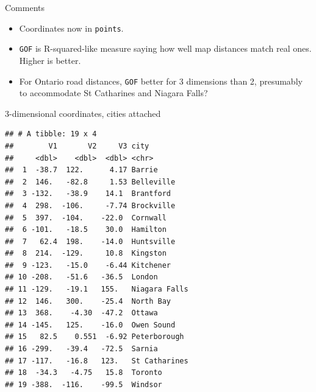 \documentclass[ignorenonframetext,]{beamer}
\newenvironment{Shaded}{\begin{snugshade}}{\end{snugshade}}
\newcommand{\DataTypeTok}[1]{\textcolor[rgb]{0.13,0.29,0.53}{#1}}
\newcommand{\FloatTok}[1]{\textcolor[rgb]{0.00,0.00,0.81}{#1}}
\newcommand{\KeywordTok}[1]{\textcolor[rgb]{0.13,0.29,0.53}{\textbf{#1}}}
\newcommand{\NormalTok}[1]{#1}
\newcommand{\OperatorTok}[1]{\textcolor[rgb]{0.81,0.36,0.00}{\textbf{#1}}}
\newcommand{\StringTok}[1]{\textcolor[rgb]{0.31,0.60,0.02}{#1}}
\begin{document}
\begin{frame}[fragile]{Comments}
\protect\hypertarget{comments-29}{}

\begin{itemize}
\item
  Coordinates now in \texttt{points}.
\item
  \texttt{GOF} is R-squared-like measure saying how well map distances
  match real ones. Higher is better.
\item
  For Ontario road distances, \texttt{GOF} better for 3 dimensions than
  2, presumably to accommodate St Catharines and Niagara Falls?
\end{itemize}

\end{frame}

\begin{frame}[fragile]{3-dimensional coordinates, cities attached}
\protect\hypertarget{dimensional-coordinates-cities-attached}{}

\tiny

\begin{Shaded}
\end{Shaded}

\begin{verbatim}
## # A tibble: 19 x 4
##        V1       V2     V3 city         
##     <dbl>    <dbl>  <dbl> <chr>        
##  1  -38.7  122.      4.17 Barrie       
##  2  146.   -82.8     1.53 Belleville   
##  3 -132.   -38.9    14.1  Brantford    
##  4  298.  -106.     -7.74 Brockville   
##  5  397.  -104.    -22.0  Cornwall     
##  6 -101.   -18.5    30.0  Hamilton     
##  7   62.4  198.    -14.0  Huntsville   
##  8  214.  -129.     10.8  Kingston     
##  9 -123.   -15.0    -6.44 Kitchener    
## 10 -208.   -51.6   -36.5  London       
## 11 -129.   -19.1   155.   Niagara Falls
## 12  146.   300.    -25.4  North Bay    
## 13  368.    -4.30  -47.2  Ottawa       
## 14 -145.   125.    -16.0  Owen Sound   
## 15   82.5    0.551  -6.92 Peterborough 
## 16 -299.   -39.4   -72.5  Sarnia       
## 17 -117.   -16.8   123.   St Catharines
## 18  -34.3   -4.75   15.8  Toronto      
## 19 -388.  -116.    -99.5  Windsor
\end{verbatim}

\normalsize

\end{frame}
\end{document}
